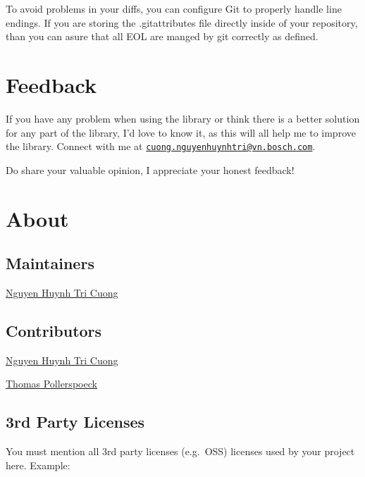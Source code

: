 To avoid problems in your diffs, you can configure Git to properly
handle line endings. If you are storing the .gitattributes file directly
inside of your repository, than you can asure that all EOL are manged by
git correctly as defined.


\hypertarget{feedback}{%
\section{Feedback}\label{feedback}}

If you have any problem when using the library or think there is a
better solution for any part of the library, I'd love to know it, as
this will all help me to improve the library. Connect with me at
\href{mailto:cuong.nguyenhuynhtri@vn.bosch.com}{\nolinkurl{cuong.nguyenhuynhtri@vn.bosch.com}}.

Do share your valuable opinion, I appreciate your honest feedback!

\hypertarget{about}{%
\section{About}\label{about}}

\hypertarget{maintainers}{%
\subsection{Maintainers}\label{maintainers}}

\href{cuong.nguyenhuynhtri@vn.bosch.com}{Nguyen Huynh Tri Cuong}

\hypertarget{contributors}{%
\subsection{Contributors}\label{contributors}}

\href{cuong.nguyenhuynhtri@vn.bosch.com}{Nguyen Huynh Tri Cuong}

\href{thomas.pollerspoeck@de.bosch.com}{Thomas Pollerspoeck}

\hypertarget{rd-party-licenses}{%
\subsection{3rd Party Licenses}\label{rd-party-licenses}}

You must mention all 3rd party licenses (e.g.~OSS) licenses used by your
project here. Example:

